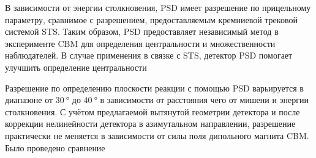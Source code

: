 В зависимости от энергии столкновения, PSD имеет разрешение по прицельному параметру, сравнимое с разрешением, предоставляемым кремниевой трековой системой STS. Таким образом, PSD предоставляет независимый метод в эксперименте CBM для определения центральности и множественности наблюдателей. В случае применения в связке с STS, детектор PSD помогает улучшить определение центральности 


Разрешение по определению плоскости реакции с помощью PSD варьируется в диапазоне от $\SI{30}{\degree}$ до $\SI{40}{\degree}$ в зависимости от расстояния \todo чего \todo от мишени и энергии столкновения. С учётом предлагаемой вытянутой геометрии детектора и после коррекции нелинейности детектора в азимутальном направлении, разрешение практически не меняется в зависимости от силы поля дипольного магнита CBM. Было проведено сравнение 

